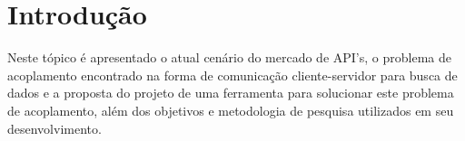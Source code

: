 \chapter{Introdução}

Neste tópico é apresentado o atual cenário do mercado de API's, o problema de acoplamento encontrado na forma de comunicação cliente-servidor para busca de dados e a proposta do projeto de uma ferramenta para solucionar este problema de acoplamento, além dos objetivos e metodologia de pesquisa utilizados em seu desenvolvimento.





